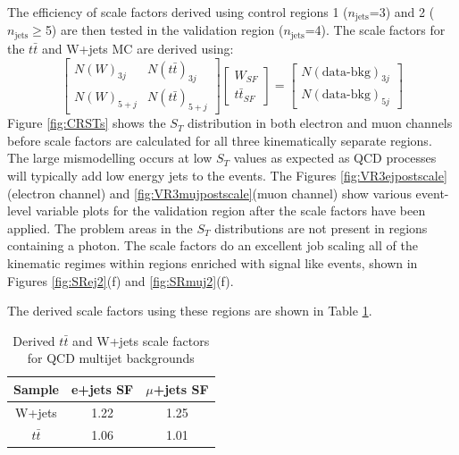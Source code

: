 The efficiency of scale factors derived using control regions 1 ($n_{\text{jets}}$=3) and 2 ($n_{\text{jets}}\geq$5) are then tested in the validation region ($n_{\text{jets}}$=4).  The scale factors for the $t\bar{t}$ and W+jets MC are derived using:
\[ 
\begin{bmatrix}  
N(W)_{3j} & N(t\bar{t})_{3j} \\ N(W)_{5+j} & N(t\bar{t})_{5+j} \end{bmatrix} \begin{bmatrix} W_{SF} \\ t\bar{t}_{SF} \end{bmatrix} =
 \begin{bmatrix} N(\text{data-bkg})_{3j} \\N(\text{data-bkg})_{5j} \end{bmatrix}
\]
Figure \ref{fig:CRSTs} shows the $S_T$ distribution in both electron and muon channels before scale factors are calculated for all three kinematically separate regions.  The large mismodelling occurs at low $S_T$ values as expected as QCD processes will typically add low energy jets to the events.  The  Figures \ref{fig:VR3ejpostscale}(electron channel) and \ref{fig:VR3mujpostscale}(muon channel) show various event-level variable plots for the validation region after the scale factors have been applied.  The problem areas in the $S_T$ distributions are not present in regions containing a photon.  The scale factors do an excellent job scaling all of the kinematic regimes within regions enriched with signal like events, shown in Figures \ref{fig:SRej2}(f) and \ref{fig:SRmuj2}(f).

The derived scale factors using these regions are shown in Table \ref{tab:CR12SFs}.
\begin{table}[h]
\begin{center}
{\renewcommand{\arraystretch}{1.2}
\begin{tabular}{ccc}
\hline
Sample     &  e+jets SF   & $\mu$+jets SF  \\  \hline 
W+jets    &  1.22   &  1.25	\\
$t\bar{t}$  &  1.06    &  1.01	\\ \hline
\end{tabular}
\caption{Derived $t\bar{t}$ and W+jets scale factors for QCD multijet backgrounds}
\label{tab:CR12SFs}
}
\end{center}
\end{table}


